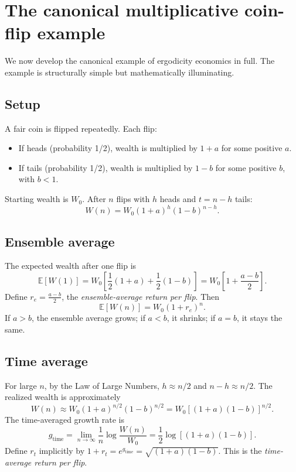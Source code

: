 \section{The canonical multiplicative coin-flip example}
\label{sec:coin-flip}

We now develop the canonical example of ergodicity economics in
full. The example is structurally simple but mathematically
illuminating.

\subsection{Setup}

A fair coin is flipped repeatedly. Each flip:

\begin{itemize}[leftmargin=2em]
    \item If heads (probability 1/2), wealth is multiplied by
    $1 + a$ for some positive $a$.
    \item If tails (probability 1/2), wealth is multiplied by
    $1 - b$ for some positive $b$, with $b < 1$.
\end{itemize}

Starting wealth is $W_0$. After $n$ flips with $h$ heads and $t = n - h$
tails:
\[
    W(n) = W_0 (1+a)^h (1-b)^{n-h}.
\]

\subsection{Ensemble average}

The expected wealth after one flip is
\[
    \mathbb{E}[W(1)] = W_0 \left[ \frac{1}{2}(1+a) + \frac{1}{2}(1-b) \right]
    = W_0 \left[ 1 + \frac{a-b}{2} \right].
\]
Define $r_e = \frac{a-b}{2}$, the \emph{ensemble-average return per
flip}. Then
\[
    \mathbb{E}[W(n)] = W_0 (1 + r_e)^n.
\]
If $a > b$, the ensemble average grows; if $a < b$, it shrinks; if
$a = b$, it stays the same.

\subsection{Time average}

For large $n$, by the Law of Large Numbers, $h \approx n/2$ and
$n - h \approx n/2$. The realized wealth is approximately
\[
    W(n) \approx W_0 (1+a)^{n/2} (1-b)^{n/2} = W_0 \left[ (1+a)(1-b) \right]^{n/2}.
\]
The time-averaged growth rate is
\[
    g_{\text{time}} = \lim_{n \to \infty} \frac{1}{n} \log\frac{W(n)}{W_0}
    = \frac{1}{2} \log[(1+a)(1-b)].
\]
Define $r_t$ implicitly by $1 + r_t = e^{g_{\text{time}}} =
\sqrt{(1+a)(1-b)}$. This is the \emph{time-average return per flip}.

